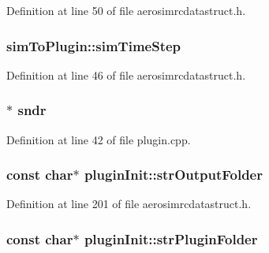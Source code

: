 Definition at line 50 of file aerosimrcdatastruct.\-h.

\hypertarget{group___aero_sim_r_c_ga58a610591c7eb9b7e1f32208e4cb343c}{
\subsubsection[{sim\-Time\-Step}]{ sim\-To\-Plugin\-::sim\-Time\-Step}}\label{group___aero_sim_r_c_ga58a610591c7eb9b7e1f32208e4cb343c}


Definition at line 46 of file aerosimrcdatastruct.\-h.

\hypertarget{group___aero_sim_r_c_ga74a874f84e60aa753bdb56cd47d55d8b}{
\subsubsection[{sndr}]{$\ast$ sndr}}\label{group___aero_sim_r_c_ga74a874f84e60aa753bdb56cd47d55d8b}


Definition at line 42 of file plugin.\-cpp.

\hypertarget{group___aero_sim_r_c_ga9149810daf40b3b4e5f706faaa8dcc8f}{
\subsubsection[{str\-Output\-Folder}]{\setlength{\rightskip}{0pt plus 5cm}const char$\ast$ plugin\-Init\-::str\-Output\-Folder}}\label{group___aero_sim_r_c_ga9149810daf40b3b4e5f706faaa8dcc8f}


Definition at line 201 of file aerosimrcdatastruct.\-h.

\hypertarget{group___aero_sim_r_c_ga1ea4ae7485e88859f164a5e904600834}{
\subsubsection[{str\-Plugin\-Folder}]{\setlength{\rightskip}{0pt plus 5cm}const char$\ast$ plugin\-Init\-::str\-Plugin\-Folder}}\label{group___aero_sim_r_c_ga1ea4ae7485e88859f164a5e904600834}


